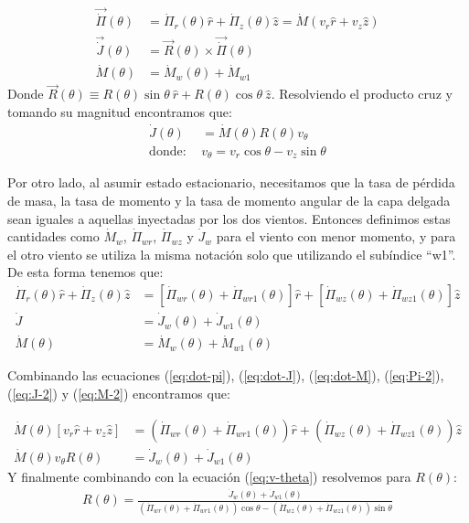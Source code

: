 \begin{align}
  \vec{\dot{\Pi}}(\theta) &= \dot{\Pi}_r(\theta) \hat{r} + \dot{\Pi}_z(\theta) \hat{z} = \dot{M}\left(v_r \hat{r} + v_z\hat{z}\right) \label{eq:dot-pi}\\
  \vec{\dot{J}}(\theta) &= \vec{R}(\theta) \times \vec{\dot{\Pi}}(\theta)  \\
  \dot{M}(\theta) &= \dot{M}_w(\theta) + \dot{M}_{w1} \label{eq:dot-M}
\end{align}
Donde $\vec{R}(\theta)\equiv R(\theta)\sin\theta~\hat{r} + R(\theta)\cos\theta~\hat{z}$. Resolviendo el producto cruz y tomando su magnitud encontramos que:
\begin{align}
  \dot{J}(\theta) &= \dot{M}(\theta)R(\theta)v_\theta \label{eq:dot-J}\\
  \mathrm{donde:~} & v_\theta = v_r\cos\theta - v_z\sin\theta \label{eq:v-theta}
\end{align}

Por otro lado, al asumir estado estacionario, necesitamos que la tasa de pérdida de masa, la tasa de momento y la tasa de momento angular de la capa delgada sean iguales a aquellas inyectadas por los dos vientos. Entonces definimos estas cantidades como $\dot{M}_w$, $\dot{\Pi}_{wr}$, $\dot{\Pi}_{wz}$ y $\dot{J}_{w}$ para el viento con menor momento, y para el otro viento se utiliza la misma notación solo que utilizando el subíndice ``w1''. De esta forma tenemos que:
\begin{align}
  \dot{\Pi}_r(\theta)\hat{r} + \dot{\Pi}_z(\theta)\hat{z} &= \left[\dot{\Pi}_{wr}(\theta)+ \dot{\Pi}_{wr1}(\theta)\right]\hat{r} + \left[\dot{\Pi}_{wz}(\theta)+ \dot{\Pi}_{wz1}(\theta)\right]\hat{z} \label{eq:Pi-2} \\
  \dot{J} &=\dot{J}_w(\theta) + \dot{J}_{w1}(\theta) \label{eq:J-2}\\
  \dot{M}(\theta) &= \dot{M}_w(\theta) + \dot{M}_{w1}(\theta) \label{eq:M-2}
\end{align}

Combinando las ecuaciones (\ref{eq:dot-pi}), (\ref{eq:dot-J}), (\ref{eq:dot-M}), (\ref{eq:Pi-2}), (\ref{eq:J-2}) y (\ref{eq:M-2}) encontramos que:

\begin{align}
  \dot{M}(\theta)\left[v_r \hat{r} + v_z\hat{z}\right] &= \left(\dot{\Pi}_{wr}(\theta) + \dot{\Pi}_{wr1}(\theta)\right)\hat{r} +
                                                         \left(\dot{\Pi}_{wz}(\theta) + \dot{\Pi}_{wz1}(\theta)\right)\hat{z} \\
  \dot{M}(\theta)v_\theta R(\theta) &= \dot{J}_w(\theta) + \dot{J}_{w1}(\theta)
\end{align}
Y finalmente combinando con la ecuación (\ref{eq:v-theta}) resolvemos para $R(\theta)$:
\begin{align}
  R(\theta) = \frac{\dot{J}_w(\theta) + \dot{J}_{w1}(\theta)}{\left(\dot{\Pi}_{wr}(\theta) + \dot{\Pi}_{wr1}(\theta)\right)\cos\theta - \left(\dot{\Pi}_{wz}(\theta) + \dot{\Pi}_{wz1}(\theta)\right)\sin\theta} \label{eq:R-wind}
\end{align}

